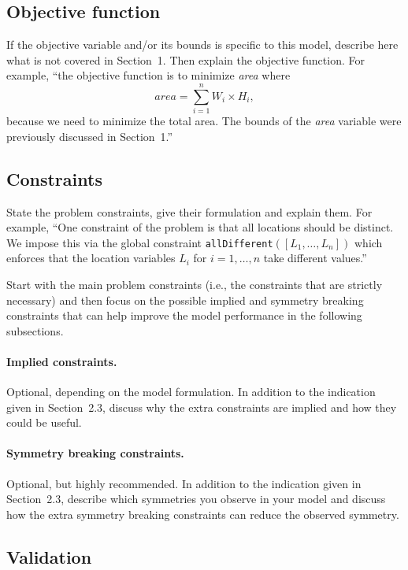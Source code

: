 \documentclass{article}
\begin{document}
\subsection{Objective function}

If the objective variable and/or its bounds is specific to this model, describe here what is not covered in Section~1. Then explain the objective function. For example, ``the objective function is to minimize \textit{area} where
\[
\textit{area} = \sum_{i=1}^{n} W_i \times H_i,
\]
because we need to minimize the total area. The bounds of the \textit{area} variable were previously discussed in Section~1.''

\subsection{Constraints}

State the problem constraints, give their formulation and explain them. For example, ``One constraint of the problem is that all locations should be distinct. We impose this via the global constraint \texttt{allDifferent}$( [L_1, \dots, L_n] )$ which enforces that the location variables $L_i$ for $i = 1, \dots, n$ take different values.''

Start with the main problem constraints (i.e., the constraints that are strictly necessary) and then focus on the possible implied and symmetry breaking constraints that can help improve the model performance in the following subsections.

\paragraph{Implied constraints.} Optional, depending on the model formulation. In addition to the indication given in Section~2.3, discuss why the extra constraints are implied and how they could be useful.

\paragraph{Symmetry breaking constraints.} Optional, but highly recommended. In addition to the indication given in Section~2.3, describe which symmetries you observe in your model and discuss how the extra symmetry breaking constraints can reduce the observed symmetry.

\subsection{Validation}
\end{document}
